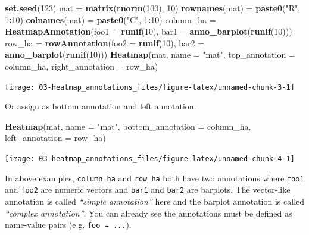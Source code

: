 \documentclass[]{book}
\newenvironment{Shaded}{\begin{snugshade}}{\end{snugshade}}
\newcommand{\KeywordTok}[1]{\textcolor[rgb]{0.13,0.29,0.53}{\textbf{#1}}}
\newcommand{\DataTypeTok}[1]{\textcolor[rgb]{0.13,0.29,0.53}{#1}}
\newcommand{\DecValTok}[1]{\textcolor[rgb]{0.00,0.00,0.81}{#1}}
\newcommand{\StringTok}[1]{\textcolor[rgb]{0.31,0.60,0.02}{#1}}
\newcommand{\OperatorTok}[1]{\textcolor[rgb]{0.81,0.36,0.00}{\textbf{#1}}}
\newcommand{\NormalTok}[1]{#1}
\theoremstyle{definition}
\theoremstyle{definition}
\theoremstyle{definition}
\theoremstyle{remark}
\begin{document}
\begin{Shaded}
\begin{Highlighting}[]
\KeywordTok{set.seed}\NormalTok{(}\DecValTok{123}\NormalTok{)}
\NormalTok{mat =}\StringTok{ }\KeywordTok{matrix}\NormalTok{(}\KeywordTok{rnorm}\NormalTok{(}\DecValTok{100}\NormalTok{), }\DecValTok{10}\NormalTok{)}
\KeywordTok{rownames}\NormalTok{(mat) =}\StringTok{ }\KeywordTok{paste0}\NormalTok{(}\StringTok{"R"}\NormalTok{, }\DecValTok{1}\OperatorTok{:}\DecValTok{10}\NormalTok{)}
\KeywordTok{colnames}\NormalTok{(mat) =}\StringTok{ }\KeywordTok{paste0}\NormalTok{(}\StringTok{"C"}\NormalTok{, }\DecValTok{1}\OperatorTok{:}\DecValTok{10}\NormalTok{)}
\NormalTok{column_ha =}\StringTok{ }\KeywordTok{HeatmapAnnotation}\NormalTok{(}\DataTypeTok{foo1 =} \KeywordTok{runif}\NormalTok{(}\DecValTok{10}\NormalTok{), }\DataTypeTok{bar1 =} \KeywordTok{anno_barplot}\NormalTok{(}\KeywordTok{runif}\NormalTok{(}\DecValTok{10}\NormalTok{)))}
\NormalTok{row_ha =}\StringTok{ }\KeywordTok{rowAnnotation}\NormalTok{(}\DataTypeTok{foo2 =} \KeywordTok{runif}\NormalTok{(}\DecValTok{10}\NormalTok{), }\DataTypeTok{bar2 =} \KeywordTok{anno_barplot}\NormalTok{(}\KeywordTok{runif}\NormalTok{(}\DecValTok{10}\NormalTok{)))}
\KeywordTok{Heatmap}\NormalTok{(mat, }\DataTypeTok{name =} \StringTok{"mat"}\NormalTok{, }\DataTypeTok{top_annotation =}\NormalTok{ column_ha, }\DataTypeTok{right_annotation =}\NormalTok{ row_ha)}
\end{Highlighting}
\end{Shaded}

\begin{center}\texttt{[image: 03-heatmap\_annotations\_files/figure-latex/unnamed-chunk-3-1]} \end{center}

Or assign as bottom annotation and left annotation.

\begin{Shaded}
\begin{Highlighting}[]
\KeywordTok{Heatmap}\NormalTok{(mat, }\DataTypeTok{name =} \StringTok{"mat"}\NormalTok{, }\DataTypeTok{bottom_annotation =}\NormalTok{ column_ha, }\DataTypeTok{left_annotation =}\NormalTok{ row_ha)}
\end{Highlighting}
\end{Shaded}

\begin{center}\texttt{[image: 03-heatmap\_annotations\_files/figure-latex/unnamed-chunk-4-1]} \end{center}

In above examples, \texttt{column\_ha} and \texttt{row\_ha} both have
two annotations where \texttt{foo1} and \texttt{foo2} are numeric
vectors and \texttt{bar1} and \texttt{bar2} are barplots. The
vector-like annotation is called \emph{``simple annotation''} here and
the barplot annotation is called \emph{``complex annotation''}. You can
already see the annotations must be defined as name-value pairs (e.g.
\texttt{foo\ =\ ...}).
\end{document}
